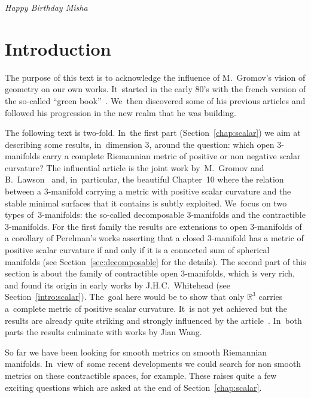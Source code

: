 \documentclass[pdftex]{sigma}
\numberwithin{equation}{section}
\begin{document}
\renewcommand{\thefootnote}{\arabic{footnote}}
\setcounter{footnote}{0}

\begin{flushright}
\emph{Happy Birthday Misha}
\end{flushright}

\section{Introduction}

The purpose of this text is to acknowledge the influence of M.~Gromov's vision of geometry on our own works. It~started in the early 80's with the french version of the so-called ``green book''~\cite{Gr1}. We~then discovered some of his previous articles and followed his progression in the new realm that he was building.

The following text is two-fold. In~the first part (Section~\ref{chap:scalar}) we aim at describing some results, in~dimension $3$, around the question: which open $3$-manifolds carry a complete Riemannian metric of positive or non negative scalar curvature? The influential article is the joint work by~M.~Gromov and B.~Lawson~\cite{GromovLawson} and, in~particular, the beautiful Chapter~10 where the relation between a $3$-manifold carrying a metric with positive scalar curvature and the stable minimal surfaces that it contains is subtly exploited. We~focus on two types of~$3$-manifolds: the so-called decomposable $3$-manifolds and the contractible
$3$-manifolds. For the first family the results are extensions to open $3$-manifolds of a corollary of Perelman's works asserting that a closed $3$-manifold has a metric of positive scalar curvature if and only if it is
a connected sum of spherical manifolds (see Section~\ref{sec:decomposable} for the details). The second part of this section is about the family of contractible open $3$-manifolds, which is very rich, and found its origin
in early works by J.H.C.~Whitehead (see Section~\ref{intro:scalar}). The~goal here would be to show that only $\mathbb{R}^3$ carries a~complete metric of positive scalar curvature. It~is not yet achieved but the results are already quite striking and strongly influenced by the article~\cite{GromovLawson}. In~both parts the results culminate with works by Jian Wang.

So far we have been looking for smooth metrics on smooth Riemannian manifolds. In~view of~some recent developments we could search for non smooth metrics on these contractible spaces, for example. These raises quite a few exciting questions which are asked at the end of Section~\ref{chap:scalar}.
\end{document}
